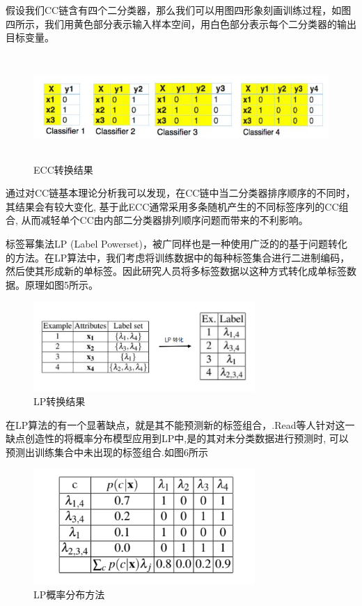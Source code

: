 假设我们CC链含有四个二分类器，那么我们可以用图四形象刻画训练过程，如图四所示，我们用黄色部分表示输入样本空间，用白色部分表示每个二分类器的输出目标变量。

\begin{figure}[htbp!]
	\centering
	\includegraphics[width=14cm, height=4cm]{figures/p2-5.png}
	\caption{ECC转换结果}\label{fig:p2-5}
	\vspace{-1em}
\end{figure}

通过对CC链基本理论分析我可以发现，在CC链中当二分类器排序顺序的不同时，其结果会有较大变化, 基于此ECC通常采用多条随机产生的不同标签序列的CC组合, 从而减轻单个CC由内部二分类器排列顺序问题而带来的不利影响。

标签幂集法LP (Label Powerset)，被广同样也是一种使用广泛的的基于问题转化的方法。在LP算法中，我们考虑将训练数据中的每种标签集合进行二进制编码，然后使其形成新的单标签。因此研究人员将多标签数据以这种方式转化成单标签数据。原理如图5所示。

\begin{figure}[htbp!]
	\centering
	\includegraphics[width=0.75\textwidth]{figures/p2-6.png}
	\caption{LP转换结果}\label{fig:p2-6}
	\vspace{-1em}
\end{figure}

在LP算法的有一个显著缺点，就是其不能预测新的标签组合，.Read等人针对这一缺点创造性的将概率分布模型应用到LP中,是的其对未分类数据进行预测时, 可以预测出训练集合中未出现的标签组合\cite{Agrawal2013Multi}.如图6所示

\begin{figure}[htbp!]
	\centering
	\includegraphics[width=0.75\textwidth]{figures/p2-7.png}
	\caption{LP概率分布方法}\label{fig:p2-7}
	\vspace{-1em}
\end{figure}

